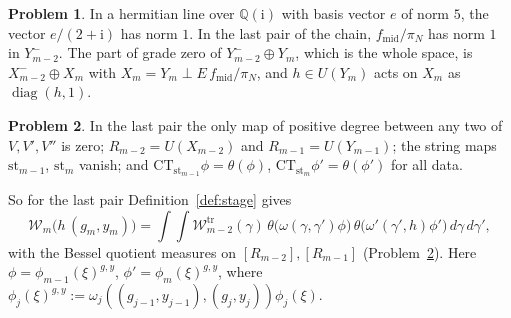 \documentclass[reqno]{amsart}
\theoremstyle{definition}
\newtheorem{problem}{Problem}[section]
\theoremstyle{plain}
\theoremstyle{remark}
\newcommand{\ii}{\mathrm{i}}
\newcommand{\Wc}{\mathcal{W}}
\newcommand{\st}{\mathrm{st}}
\newcommand{\CT}{\mathrm{CT}}
\newcommand{\diag}{\operatorname{diag}}
\newcommand{\fm}{f_{\mathrm{mid}}}
\newcommand{\Wtr}{\Wc^{\mathrm{tr}}}
\begin{document}
\begin{problem}\label{pr:last-pair}
In a hermitian line over \(\mathbb Q(\ii)\) with basis vector \(e\) of norm \(5\), the vector \(e/(2+\ii)\) has norm \(1\).  In the last pair of the chain, \(\fm/\pi_N\) has norm \(1\) in \(Y_{m-2}^-\).  The part of grade zero of \(Y_{m-2}^- \oplus Y_m\), which is the whole space, is \(X_{m-2}^- \oplus X_m\) with \(X_m = Y_m \perp E\,\fm/\pi_N\), and \(h \in U(Y_m)\) acts on \(X_m\) as \(\diag(h, 1)\).
\end{problem}

\begin{problem}\label{pr:A-last}
In the last pair the only map of positive degree between any two of \(V, V', V''\) is zero; \(R_{m-2} = U(X_{m-2})\) and \(R_{m-1} = U(Y_{m-1})\); the string maps \(\st_{m-1}\), \(\st_m\) vanish; and \(\CT_{\st_{m-1}}\phi = \theta(\phi)\), \(\CT_{\st_m}\phi' = \theta(\phi')\) for all data.
\end{problem}

So for the last pair Definition~\ref{def:stage} gives
\begin{equation}\label{eq:last-stage}
  \Wc_m\bigl(h\,(g_m, y_m)\bigr) = \int\!\!\int \Wtr_{m-2}(\gamma)\,\theta\bigl(\omega(\gamma, \gamma')\phi\bigr)\,\theta\bigl(\omega'(\gamma', h)\phi'\bigr)\,d\gamma\,d\gamma' ,
\end{equation}
with the Bessel quotient measures on \([R_{m-2}],[R_{m-1}]\) (Problem~\ref{pr:A-last}).  Here \(\phi=\phi_{m-1}(\xi)^{g,y}\), \(\phi'=\phi_m(\xi)^{g,y}\), where
\(\phi_j(\xi)^{g,y}:=\omega_j((g_{j-1},y_{j-1}),(g_j,y_j))\phi_j(\xi)\).
\end{document}
